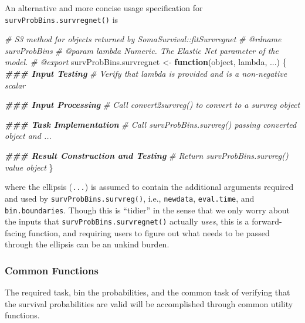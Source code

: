 \documentclass[
]{book}
\newenvironment{Shaded}{\begin{snugshade}}{\end{snugshade}}
\newcommand{\CommentTok}[1]{\textcolor[rgb]{0.56,0.35,0.01}{\textit{#1}}}
\newcommand{\ControlFlowTok}[1]{\textcolor[rgb]{0.13,0.29,0.53}{\textbf{#1}}}
\newcommand{\DocumentationTok}[1]{\textcolor[rgb]{0.56,0.35,0.01}{\textbf{\textit{#1}}}}
\newcommand{\NormalTok}[1]{#1}
\newcommand{\OtherTok}[1]{\textcolor[rgb]{0.56,0.35,0.01}{#1}}
\begin{document}
An alternative and more concise usage specification for \texttt{survProbBins.survregnet()} is

\begin{Shaded}
\begin{Highlighting}[]
\CommentTok{\#\textquotesingle{} S3 method for objects returned by \textasciigrave{}SomaSurvival::fitSurvregnet\textasciigrave{}}
\CommentTok{\#\textquotesingle{} @rdname survProbBins}
\CommentTok{\#\textquotesingle{} @param lambda Numeric. The Elastic Net parameter of the model. }
\CommentTok{\#\textquotesingle{} @export}
\NormalTok{survProbBins.survregnet }\OtherTok{\textless{}{-}} \ControlFlowTok{function}\NormalTok{(object, lambda, ...) \{}
  \DocumentationTok{\#\#\# Input Testing}
  \CommentTok{\# Verify that \textasciigrave{}lambda\textasciigrave{} is provided and is a non{-}negative scalar}
  
  \DocumentationTok{\#\#\# Input Processing}
  \CommentTok{\# Call convert2survreg() to convert to a \textasciigrave{}survreg\textasciigrave{} object}
  
  \DocumentationTok{\#\#\# Task Implementation}
  \CommentTok{\# Call survProbBins.survreg() passing converted object and ...}
  
  \DocumentationTok{\#\#\# Result Construction and Testing}
  \CommentTok{\# Return \textasciigrave{}survProbBins.survreg()\textasciigrave{} value object}
\NormalTok{\}}
\end{Highlighting}
\end{Shaded}

where the ellipsis (\texttt{...}) is assumed to contain the additional arguments required and used by \texttt{survProbBins.survreg()}, i.e., \texttt{newdata}, \texttt{eval.time}, and \texttt{bin.boundaries}. Though this is ``tidier'' in the sense that we only worry about the inputs that \texttt{survProbBins.survregnet()} actually \emph{uses}, this is a forward-facing function, and requiring users to figure out what needs to be passed through the ellipsis can be an unkind burden.

\hypertarget{common-functions}{%
\subsubsection{Common Functions}\label{common-functions}}

The required task, bin the probabilities, and the common task of verifying that the survival probabilities are valid will be accomplished through common utility functions.
\end{document}
